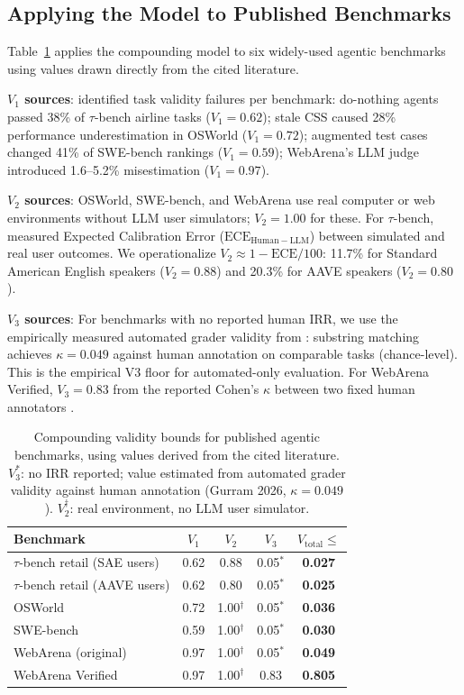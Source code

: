 \documentclass[preprint,12pt]{elsarticle}
\newcommand{\vtot}{V_{\text{total}}}
\begin{document}
\subsection{Applying the Model to Published Benchmarks}
\label{sec:worked-example}

Table~\ref{tab:vtotal} applies the compounding model to six widely-used agentic
benchmarks using values drawn directly from the cited literature.

\textbf{$V_1$ sources}: \citet{zhu2025} identified task validity failures
per benchmark: do-nothing agents passed 38\% of $\tau$-bench airline tasks
($V_1 = 0.62$); stale CSS caused 28\% performance underestimation in OSWorld
($V_1 = 0.72$); augmented test cases changed 41\% of SWE-bench rankings
($V_1 = 0.59$); WebArena's LLM judge introduced 1.6--5.2\% misestimation
($V_1 = 0.97$).

\textbf{$V_2$ sources}: OSWorld, SWE-bench, and WebArena use real computer or web
environments without LLM user simulators; $V_2 = 1.00$ for these.
For $\tau$-bench, \citet{seshadri2026} measured Expected Calibration Error
($\mathrm{ECE}_{\mathrm{Human-LLM}}$) between simulated and real user outcomes.
We operationalize $V_2 \approx 1 - \mathrm{ECE}/100$: 11.7\% for Standard American
English speakers ($V_2 = 0.88$) and 20.3\% for AAVE speakers ($V_2 = 0.80$).

\textbf{$V_3$ sources}: For benchmarks with no reported human IRR, we use the
empirically measured automated grader validity from \citet{gurram2026}: substring
matching achieves $\kappa = 0.049$ against human annotation on comparable tasks
(chance-level). This is the empirical V3 floor for automated-only evaluation.
For WebArena Verified, $V_3 = 0.83$ from the reported Cohen's $\kappa$ between two
fixed human annotators \citep{elhattami2025}.

\begin{table}[ht]
\centering
\caption{Compounding validity bounds for published agentic benchmarks, using
values derived from the cited literature. $V_3^*$: no IRR reported; value estimated
from automated grader validity against human annotation (Gurram 2026, $\kappa=0.049$).
$V_2^{\dagger}$: real environment, no LLM user simulator.}
\label{tab:vtotal}
\small
\begin{tabular}{@{}lcccc@{}}
\toprule
Benchmark & $V_1$ & $V_2$ & $V_3$ & $\vtot \leq$ \\
\midrule
$\tau$-bench retail (SAE users) & 0.62 & 0.88 & 0.05$^*$ & \textbf{0.027} \\
$\tau$-bench retail (AAVE users) & 0.62 & 0.80 & 0.05$^*$ & \textbf{0.025} \\
OSWorld & 0.72 & 1.00$^{\dagger}$ & 0.05$^*$ & \textbf{0.036} \\
SWE-bench & 0.59 & 1.00$^{\dagger}$ & 0.05$^*$ & \textbf{0.030} \\
WebArena (original) & 0.97 & 1.00$^{\dagger}$ & 0.05$^*$ & \textbf{0.049} \\
WebArena Verified & 0.97 & 1.00$^{\dagger}$ & 0.83 & \textbf{0.805} \\
\bottomrule
\end{tabular}
\end{table}
\end{document}
